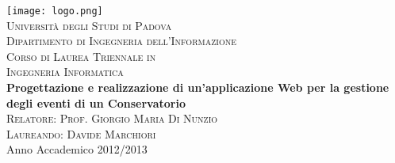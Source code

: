 



\begin{titlepage}
\begin{center}
\texttt{[image: logo.png]}\\[1.5cm]
\textsc{\LARGE Universit\`{a} degli Studi di Padova}\\[1.2cm]
\textsc{\Large Dipartimento di Ingegneria dell'Informazione}\\[0.8cm]
\textsc{\Large Corso di Laurea Triennale in}\\[0.5cm]
\textsc{\Large Ingegneria Informatica}\\[2cm]
{ \LARGE \bfseries Progettazione e realizzazione di un'applicazione Web per la gestione degli eventi di un Conservatorio}\\[2cm]
\textsc{\large Relatore: Prof. Giorgio Maria Di Nunzio}\\[0.5cm]
\textsc{\large Laureando: Davide Marchiori}\\
\vfill
{\large Anno Accademico 2012/2013}
\end{center}
\end{titlepage}


\thispagestyle{empty} %
\cleardoublepage


\thispagestyle{empty}

\clearpage{\pagestyle{plain}\cleardoublepage}
\tableofcontents

\clearpage{\pagestyle{plain}\cleardoublepage}
\listoffigures

\clearpage{\pagestyle{plain}\cleardoublepage}
\lstlistoflistings


\clearpage{\pagestyle{plain}\cleardoublepage} %

%


\clearpage{\pagestyle{plain}\cleardoublepage}
%

